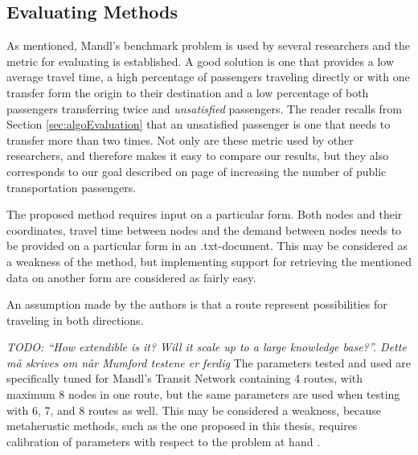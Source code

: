 \subsection{Evaluating Methods}

As mentioned, Mandl's benchmark problem is used by several researchers and the metric for evaluating is established. A good solution is one that provides a low average travel time, a high percentage of passengers traveling directly or with one transfer form the origin to their destination and a low percentage of both passengers transferring twice and \textit{unsatisfied} passengers. The reader recalls from Section \vref{sec:algoEvaluation} that an unsatisfied passenger is one that needs to transfer more than two times. Not only are these metric used by other researchers, and therefore makes it easy to compare our results, but they also corresponds to our goal described on page \pageref{itm:goal} of increasing  the number of public transportation passengers. 

The proposed method requires input on a particular form. Both nodes and their coordinates, travel time between nodes and the demand between nodes needs to be provided on a particular form in an .txt-document. This may be considered as a weakness of the method, but implementing support for retrieving the mentioned data on another form are considered as fairly easy. 

An assumption made by the authors is that a route represent possibilities for traveling in both directions. 

\emph{\color{blue} TODO: ``How extendible is it? Will it scale up to a large knowledge base?''. Dette må skrives om når Mumford testene er ferdig}
The parameters tested and used are specifically tuned for Mandl's Transit Network containing 4 routes, with maximum 8 nodes in one route, but the same parameters are used when testing with 6, 7, and 8 routes as well. This may be considered a weakness, because metaherustic methods, such as the one proposed in this thesis, requires calibration of parameters with respect to the problem at hand \citep{dobslaw09}. 

